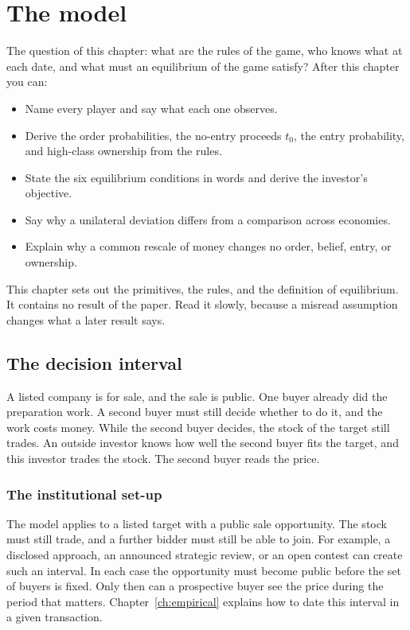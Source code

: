 \chapter{The model}\label{ch:model}

\begin{chapterplan}
The question of this chapter: what are the rules of the game, who knows what at each date, and what must an equilibrium of the game satisfy?
After this chapter you can:
\begin{itemize}
\item Name every player and say what each one observes.
\item Derive the order probabilities, the no-entry proceeds \(t_0\), the entry probability, and high-class ownership from the rules.
\item State the six equilibrium conditions in words and derive the investor's objective.
\item Say why a unilateral deviation differs from a comparison across economies.
\item Explain why a common rescale of money changes no order, belief, entry, or ownership.
\end{itemize}
\end{chapterplan}

This chapter sets out the primitives, the rules, and the definition of equilibrium. It contains no result of the paper.
Read it slowly, because a misread assumption changes what a later result says.


\section{The decision interval}\label{sec:model-interval}

A listed company is for sale, and the sale is public.
One buyer already did the preparation work. A second buyer must still decide whether to do it, and the work costs money.
While the second buyer decides, the stock of the target still trades.
An outside investor knows how well the second buyer fits the target, and this investor trades the stock.
The second buyer reads the price.

\subsection*{The institutional set-up}

The model applies to a listed target with a public sale opportunity.
The stock must still trade, and a further bidder must still be able to join.
For example, a disclosed approach, an announced strategic review, or an open contest can create such an interval.
In each case the opportunity must become public before the set of buyers is fixed.
Only then can a prospective buyer see the price during the period that matters.
Chapter~\ref{ch:empirical} explains how to date this interval in a given transaction.

